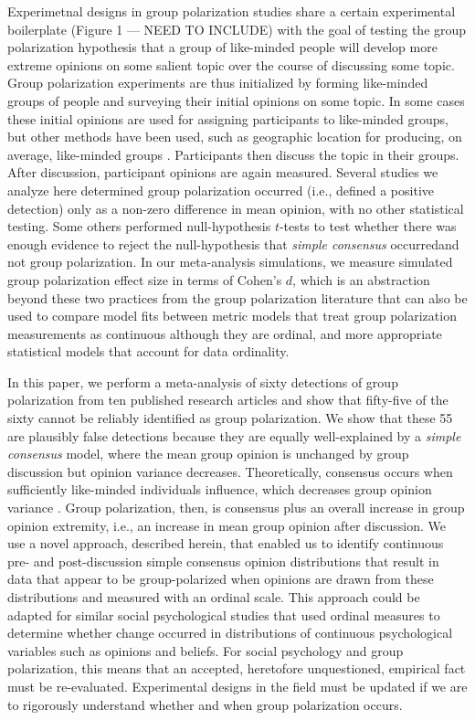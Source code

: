 \documentclass[
  abstract]{article}
\begin{document}
Experimetnal designs in group polarization studies share a certain
experimental boilerplate (Figure 1 --- NEED TO INCLUDE) with the goal of
testing the group polarization hypothesis that a group of like-minded
people will develop more extreme opinions on some salient topic over the
course of discussing some topic. Group polarization experiments are thus
initialized by forming like-minded groups of people and surveying their
initial opinions on some topic. In some cases these initial opinions are
used for assigning participants to like-minded groups, but other methods
have been used, such as geographic location for producing, on average,
like-minded groups \autocite{Schkade2010}. Participants then discuss the
topic in their groups. After discussion, participant opinions are again
measured. Several studies we analyze here determined group polarization
occurred (i.e., defined a positive detection) only as a non-zero
difference in mean opinion, with no other statistical testing. Some
others performed null-hypothesis \(t\)-tests to test whether there was
enough evidence to reject the null-hypothesis that \emph{simple
consensus} occurredand not group polarization. In our meta-analysis
simulations, we measure simulated group polarization effect size in
terms of Cohen's \(d\), which is an abstraction beyond these two
practices from the group polarization literature that can also be used
to compare model fits between metric models that treat group
polarization measurements as continuous although they are ordinal, and
more appropriate statistical models that account for data ordinality.

In this paper, we perform a meta-analysis of sixty detections of group
polarization from ten published research articles and show that
fifty-five of the sixty cannot be reliably identified as group
polarization. We show that these 55 are plausibly false detections
because they are equally well-explained by a \emph{simple consensus}
model, where the mean group opinion is unchanged by group discussion but
opinion variance decreases. Theoretically, consensus occurs when
sufficiently like-minded individuals influence, which decreases group
opinion variance \autocite{DeGroot1974,Turner2018}. Group polarization,
then, is consensus plus an overall increase in group opinion extremity,
i.e., an increase in mean group opinion after discussion. We use a novel
approach, described herein, that enabled us to identify continuous pre-
and post-discussion simple consensus opinion distributions that result
in data that appear to be group-polarized when opinions are drawn from
these distributions and measured with an ordinal scale. This approach
could be adapted for similar social psychological studies that used
ordinal measures to determine whether change occurred in distributions
of continuous psychological variables such as opinions and beliefs. For
social psychology and group polarization, this means that an accepted,
heretofore unquestioned, empirical fact must be re-evaluated.
Experimental designs in the field must be updated if we are to
rigorously understand whether and when group polarization occurs.
\end{document}
